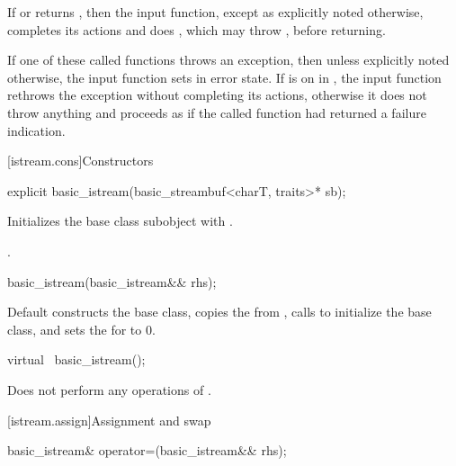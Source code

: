 \pnum
If
or
returns
,
then the input function, except as explicitly noted otherwise, completes its actions and does
,
which may throw
, before returning.

\pnum
If one of these called functions throws an exception, then unless explicitly noted otherwise,
the input function sets
in error state.
If
is on in
,
the input function
rethrows the exception without completing its actions, otherwise
it does not throw anything and proceeds as if the called function had returned
a failure indication.

[istream.cons]{Constructors}

%
\begin{itemdecl}
explicit basic_istream(basic_streambuf<charT, traits>* sb);
\end{itemdecl}

%
\begin{itemdescr}
\pnum
\effects
Initializes the base class subobject with
.

\pnum
\ensures
{}.
\end{itemdescr}


%
\begin{itemdecl}
basic_istream(basic_istream&& rhs);
\end{itemdecl}

\begin{itemdescr}
\pnum
\effects
Default constructs the base class, copies the
 from , calls
 to initialize the base
class, and sets the  for  to 0.
\end{itemdescr}

%
\begin{itemdecl}
virtual ~basic_istream();
\end{itemdecl}

\begin{itemdescr}
\pnum
\remarks
Does not perform any operations of
.
\end{itemdescr}

[istream.assign]{Assignment and swap}

%
\begin{itemdecl}
basic_istream& operator=(basic_istream&& rhs);
\end{itemdecl}

